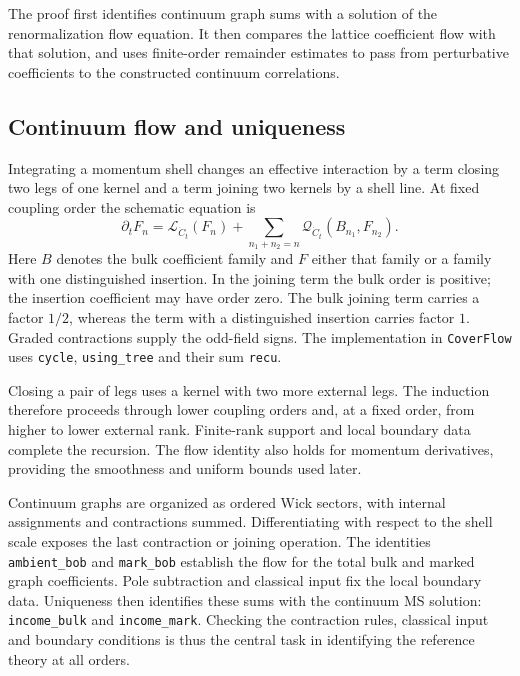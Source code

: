 \documentclass[11pt]{article}
\newcommand{\code}[1]{{\small\nolinkurl{#1}}}
\begin{document}
The proof first identifies continuum graph sums with a solution of the
renormalization flow equation. It then compares the lattice coefficient
flow with that solution, and uses finite-order remainder estimates to pass
from perturbative coefficients to the constructed continuum correlations.

\subsection{Continuum flow and uniqueness}

Integrating a momentum shell changes an effective interaction by a term
closing two legs of one kernel and a term joining two kernels by a shell
line. At fixed coupling order the schematic equation is
\begin{equation}\label{eq:flow}
 \partial_t F_n
 =\mathcal L_{\dot C_t}(F_n)
   +\sum_{n_1+n_2=n}\mathcal Q_{\dot C_t}(B_{n_1},F_{n_2}).
\end{equation}
Here $B$ denotes the bulk coefficient family and $F$ either that family or
a family with one distinguished insertion. In the joining term the bulk
order is positive; the insertion coefficient may have order zero. The
bulk joining term carries a factor $1/2$, whereas the term with a
distinguished insertion carries factor $1$. Graded contractions supply the
odd-field signs. The implementation in \code{CoverFlow} uses
\code{cycle}, \code{using_tree} and their sum \code{recu}.

Closing a pair of legs uses a kernel with two more external legs. The
induction therefore proceeds through lower coupling orders and, at a fixed
order, from higher to lower external rank. Finite-rank support and local
boundary data complete the recursion. The flow identity also holds for
momentum derivatives, providing the smoothness and uniform bounds used later.

Continuum graphs are organized as ordered Wick sectors, with internal
assignments and contractions summed. Differentiating with respect to the
shell scale exposes the last contraction or joining operation. The identities
\code{ambient_bob} and
\code{mark_bob} establish the flow for the total bulk and marked graph
coefficients. Pole subtraction and classical input fix the local boundary
data. Uniqueness then identifies these sums with the continuum MS solution:
\code{income_bulk} and \code{income_mark}. Checking the contraction rules,
classical input and boundary conditions is thus the central task in
identifying the reference theory at all orders.
\end{document}
